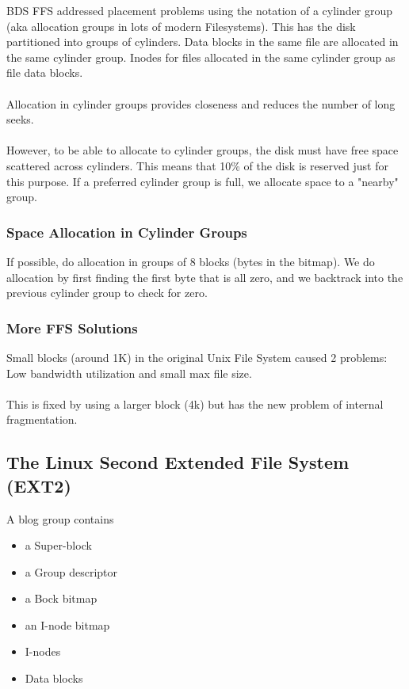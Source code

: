 \documentclass{article}
\begin{document}
BDS FFS addressed placement problems using the notation of a cylinder group (aka allocation groups in lots of modern Filesystems). This has the disk partitioned into groups of cylinders. Data blocks in the same file are allocated in the same cylinder group. Inodes for files allocated in the same cylinder group as file data blocks.
\\
\\
Allocation in cylinder groups provides closeness and reduces the number of long seeks.
\\
\\
However, to be able to allocate to cylinder groups, the disk must have free space scattered across cylinders. This means that 10\% of the disk is reserved just for this purpose. If a preferred cylinder group is full, we allocate space to a "nearby" group.

\subsubsection{Space Allocation in Cylinder Groups}

If possible, do allocation in groups of 8 blocks (bytes in the bitmap). We do allocation by first finding the first byte that is all zero, and we backtrack into the previous cylinder group to check for zero.

\subsubsection{More FFS Solutions}

Small blocks (around 1K) in the original Unix File System caused 2 problems: Low bandwidth utilization and small max file size.
\\
\\
This is fixed by using a larger block (4k) but has the new problem of internal fragmentation.

\subsection{The Linux Second Extended File System (EXT2)}

A blog group contains
\begin{itemize}
    \item a Super-block
    \item a Group descriptor
    \item a Bock bitmap
    \item an I-node bitmap
    \item I-nodes
    \item Data blocks
\end{itemize}
\end{document}
